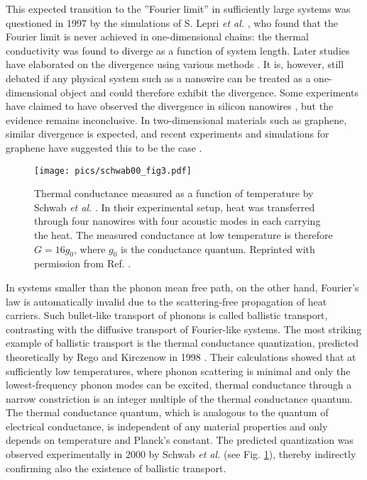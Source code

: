 This expected transition to the ''Fourier limit'' in sufficiently large systems was questioned in 1997 by the simulations of S. Lepri \textit{et al.} \cite{lepri97}, who found that the Fourier limit is never achieved in one-dimensional chains: the thermal conductivity was found to diverge as a function of system length. Later studies have elaborated on the divergence using various methods \cite{narayan02,mai07}. It is, however, still debated \cite{} if any physical system such as a nanowire can be treated as a one-dimensional object and could therefore exhibit the divergence. Some experiments have claimed to have observed the divergence in silicon nanowires \cite{yang10}, but the evidence remains inconclusive. In two-dimensional materials such as graphene, similar divergence is expected, and recent experiments and simulations for graphene have suggested this to be the case \cite{xu14}. 

\begin{figure}
\begin{center}
 \texttt{[image: pics/schwab00\_fig3.pdf]}
 \caption{Thermal conductance measured as a function of temperature by Schwab \textit{et al.} \cite{schwab00}. In their experimental setup, heat was transferred through four nanowires with four acoustic modes in each carrying the heat. The measured conductance at low temperature is therefore $G=16g_0$, where $g_0$ is the conductance quantum. Reprinted with permission from Ref. \cite{schwab00}.}
\label{fig:intro_schwab}
\end{center}
\end{figure}

In systems smaller than the phonon mean free path, on the other hand, Fourier's law is automatically invalid due to the scattering-free propagation of heat carriers. Such bullet-like transport of phonons is called ballistic transport, contrasting with the diffusive transport of Fourier-like systems. The most striking example of ballistic transport is the thermal conductance quantization, predicted theoretically by Rego and Kirczenow in 1998 \cite{rego98}. Their calculations showed that at sufficiently low temperatures, where phonon scattering is minimal and only the lowest-frequency phonon modes can be excited, thermal conductance through a narrow constriction is an integer multiple of the thermal conductance quantum. The thermal conductance quantum, which is analogous to the quantum of electrical conductance, is independent of any material properties and only depends on temperature and Planck's constant. The predicted quantization was observed experimentally in 2000 by Schwab \textit{et al.} \cite{schwab00} (see Fig. \ref{fig:intro_schwab}), thereby indirectly confirming also the existence of ballistic transport.

